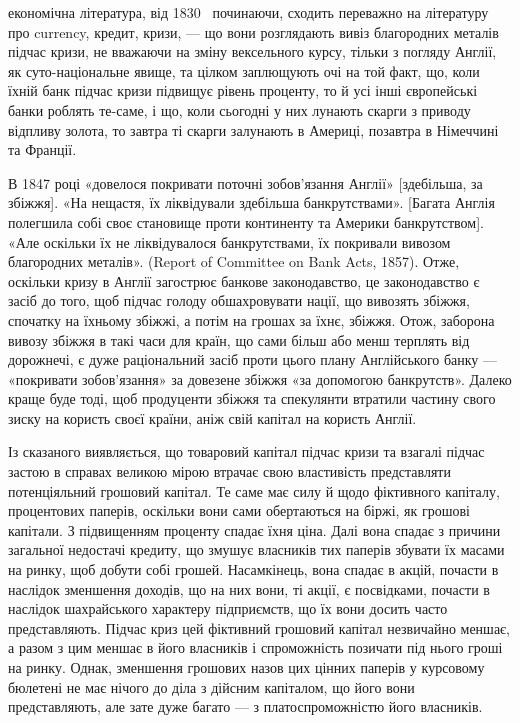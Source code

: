 \parcont{}  %
економічна література, від 1830~ починаючи, сходить переважно на літературу
про currency, кредит, кризи, — що вони розглядають вивіз благородних металів підчас
кризи, не вважаючи на зміну вексельного курсу, тільки з погляду Англії, як
суто-національне явище, та цілком заплющують очі на той факт, що, коли їхній
банк підчас кризи підвищує рівень проценту, то й усі інші європейські банки
роблять те-саме, і що, коли сьогодні у них лунають скарги з приводу відпливу
золота, то завтра ті скарги залунають в Америці, позавтра в Німеччині та Франції.

В 1847 році «довелося покривати поточні зобов’язання Англії» [здебільша, за
збіжжя]. «На нещастя, їх ліквідували здебільша банкрутствами». [Багата Англія
полегшила собі своє становище проти континенту та Америки банкрутством]. «Але
оскільки їх не ліквідувалося банкрутствами, їх покривали вивозом благородних
металів». (Report of Committee on Bank Acts, 1857). Отже, оскільки кризу в Англії
загострює банкове законодавство, це законодавство є засіб до того, щоб підчас
голоду обшахровувати нації, що вивозять збіжжя, спочатку на їхньому збіжжі,
а потім на грошах за їхнє, збіжжя. Отож, заборона вивозу збіжжя в такі часи
для країн, що сами більш або менш терплять від дорожнечі, є дуже раціональний
засіб проти цього плану Англійського банку — «покривати зобов’язання» за
довезене збіжжя «за допомогою банкрутств». Далеко краще буде тоді, щоб продуценти
збіжжя та спекулянти втратили частину свого зиску на користь своєї
країни, аніж свій капітал на користь Англії.

Із сказаного виявляється, що товаровий капітал підчас кризи та взагалі
підчас застою в справах великою мірою втрачає свою властивість представляти
потенціяльний грошовий капітал. Те саме має силу й щодо фіктивного
капіталу, процентових паперів, оскільки вони сами обертаються на біржі, як
грошові капітали. З підвищенням проценту спадає їхня ціна. Далі вона спадає
з причини загальної недостачі кредиту, що змушує власників тих паперів збувати
їх масами на ринку, щоб добути собі грошей. Насамкінець, вона спадає
в акцій, почасти в наслідок зменшення доходів, що на них вони, ті акції, є
посвідками, почасти в наслідок шахрайського характеру підприємств, що їх вони
досить часто представляють. Підчас криз цей фіктивний грошовий капітал незвичайно
меншає, а разом з цим меншає в його власників і спроможність позичати
під нього гроші на ринку. Однак, зменшення грошових назов цих цінних
паперів у курсовому бюлетені не має нічого до діла з дійсним капіталом, що
його вони представляють, але зате дуже багато — з платоспроможністю його
власників.

